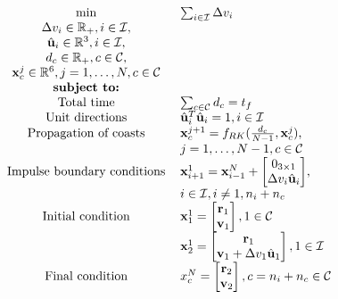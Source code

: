 \begin{align}\label{eq:ms_problem}
    \begin{tabular}{cl}
     \(\min\)                              & \(\sum_{i \in \mathcal{I}} \Delta v_i\)\\
    \(\Delta v_i  \in \R_+, i \in \mathcal{I}\), &  \\
    \(\hat{\uc}_i \in \R^3, i \in \mathcal{I}\),     & \\
    \(d_c         \in \R_+, c \in \mathcal{C}\),     & \\
    \(\x^j_c      \in \R^6, j=1,\dots,N, c \in \mathcal{C}\) & \\
    \textbf{subject to:}        & \\
    Total time                  & \(\sum_{c \in \mathcal{C}} d_c = t_f\) \\
    Unit directions             & \(\hat{\uc}_i^T \hat{\uc}_i = 1, i \in \mathcal{I}\) \\
    Propagation of coasts       & \(\x^{j+1}_c = f_{RK}(\frac{d_c}{N-1}, \x^j_c)\), \\
                                & \(j=1,\dots,N-1, c \in \mathcal{C}\) \\
    Impulse boundary conditions & \(\x^1_{i+1} = \x^{N}_{i-1} + \begin{bmatrix}
        0_{3\times1} \\ \Delta v_i \hat{\mathbf{u}}_i
    \end{bmatrix}\), \\
                                & \(i \in \mathcal{I}, i \neq 1, n_i+n_c\) \\
    Initial condition           & \(\x_1^1 = \begin{bmatrix}
        \mathbf{r}_1 \\ \mathbf{v}_1
    \end{bmatrix}, 1 \in \mathcal{C}\) \\
                                & \(\x_2^1 = \begin{bmatrix}
                                    \mathbf{r}_1 \\ \mathbf{v}_1 + \Delta v_1 \hat{\mathbf{u}}_1
                                \end{bmatrix}, 1 \in \mathcal{I}\) \\
    Final condition             & \(x_c^N = \begin{bmatrix}
        \mathbf{r}_2 \\ \mathbf{v}_2
    \end{bmatrix}, c = n_i+n_c \in \mathcal{C}\) \\

\end{tabular}
\end{align}

